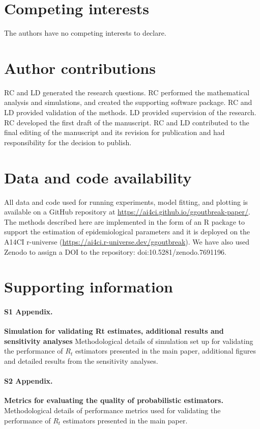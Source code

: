\documentclass[10pt,letterpaper]{article}
\begin{document}
\section*{Competing interests}

The authors have no competing interests to declare.

\section*{Author contributions}

RC and LD generated the research questions. RC performed the mathematical analysis and simulations, and created the supporting software package. RC and LD provided validation of the methods. LD provided supervision of the research. RC developed the first draft of the manuscript. RC and LD contributed to the final editing of the manuscript and its revision for publication and had responsibility for the decision to publish.

\section*{Data and code availability}

All data and code used for running experiments, model fitting, and plotting is available on a GitHub repository at \url{https://ai4ci.github.io/ggoutbreak-paper/}. The methods described here are implemented in the form of an R package to support the estimation of epidemiological parameters and it is deployed on the A14CI r-universe (\url{https://ai4ci.r-universe.dev/ggoutbreak}). We have also used Zenodo to assign a DOI to the repository: doi:10.5281/zenodo.7691196.

\section*{Supporting information}


\paragraph*{S1 Appendix.}
\label{S1_Appendix}
{\bf Simulation for validating Rt estimates, additional results and sensitivity analyses} Methodological details of simulation set up for validating the performance of $R_t$ estimators presented in the main paper, additional figures and detailed results from the sensitivity analyses.

\paragraph*{S2 Appendix.}
\label{S2_Appendix}
{\bf Metrics for evaluating the quality of probabilistic estimators.} Methodological details of performance metrics used for validating the performance of $R_t$ estimators presented in the main paper.
\end{document}
